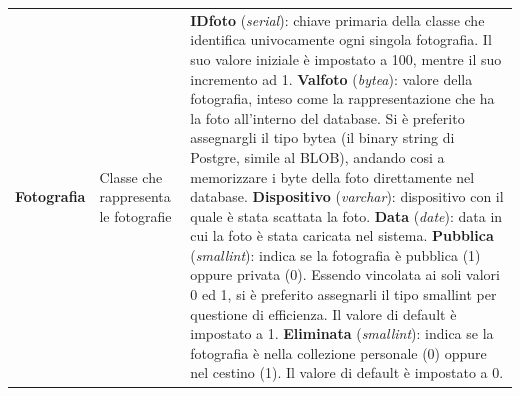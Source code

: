 \documentclass[a4paper]{article}
\begin{document}
\begin{tabular}{p{90pt}p{120pt}p{150pt}}
		\textbf{Fotografia} &
		Classe che rappresenta le fotografie &
		\textbf{ID\textunderscore foto} (\emph{serial}):
		chiave
		primaria della classe che identifica univocamente
		ogni singola fotografia. Il suo valore iniziale è
		impostato
		a 100, mentre il suo incremento ad 1. \newline 
		\textbf{Val\textunderscore foto} (\emph{bytea}):
		valore
		della fotografia, inteso come la rappresentazione che
		ha la foto all'interno del database. Si è preferito
		assegnargli il tipo bytea (il binary string di
		Postgre, simile al BLOB), andando cosi a memorizzare
		i byte della foto direttamente nel database.\newline
		\textbf{Dispositivo} (\emph{varchar}): dispositivo
		con
		il quale è stata scattata la foto.\newline 
		\textbf{Data} (\emph{date}): data in cui la foto è
		stata caricata nel sistema.\newline 
		\textbf{Pubblica} (\emph{smallint}): indica se la
		fotografia
		è pubblica (1) oppure privata (0). Essendo vincolata
		ai soli valori 0 ed 1, si è preferito
		assegnarli il tipo smallint per questione di
		efficienza. Il valore di default è impostato a 1. 
		\newline 
		\textbf{Eliminata} (\emph{smallint}): indica se la
		fotografia
		è nella collezione personale (0) oppure nel cestino
		(1). Il valore di default è impostato a 0.
		\\
	\end{tabular}
	\newpage
	
\end{document}
